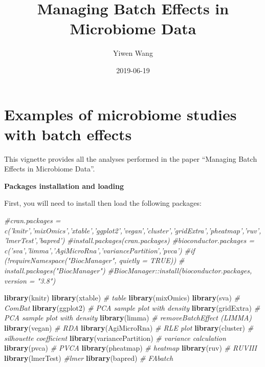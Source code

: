 \documentclass[]{book}
\title{Managing Batch Effects in Microbiome Data}
\author{Yiwen Wang}
\date{2019-06-19}
\newenvironment{Shaded}{\begin{snugshade}}{\end{snugshade}}
\newcommand{\KeywordTok}[1]{\textcolor[rgb]{0.13,0.29,0.53}{\textbf{#1}}}
\newcommand{\CommentTok}[1]{\textcolor[rgb]{0.56,0.35,0.01}{\textit{#1}}}
\newcommand{\NormalTok}[1]{#1}
\begin{document}
\maketitle

{
\setcounter{tocdepth}{3}
\tableofcontents
}
\chapter{Examples of microbiome studies with batch
effects}\label{examples-of-microbiome-studies-with-batch-effects}

This vignette provides all the analyses performed in the paper
``Managing Batch Effects in Microbiome Data''.

\textbf{Packages installation and loading}

First, you will need to install then load the following packages:

\begin{Shaded}
\begin{Highlighting}[]
\CommentTok{#cran.packages = c('knitr','mixOmics','xtable','ggplot2','vegan','cluster','gridExtra','pheatmap','ruv','lmerTest','bapred')}
\CommentTok{#install.packages(cran.packages)}
\CommentTok{#bioconductor.packages = c('sva','limma','AgiMicroRna','variancePartition','pvca')}
\CommentTok{#if (!requireNamespace("BiocManager", quietly = TRUE))}
\CommentTok{#    install.packages("BiocManager")}
\CommentTok{#BiocManager::install(bioconductor.packages, version = "3.8")}

\KeywordTok{library}\NormalTok{(knitr)}
\KeywordTok{library}\NormalTok{(xtable) }\CommentTok{# table}
\KeywordTok{library}\NormalTok{(mixOmics)}
\KeywordTok{library}\NormalTok{(sva) }\CommentTok{# ComBat}
\KeywordTok{library}\NormalTok{(ggplot2) }\CommentTok{# PCA sample plot with density}
\KeywordTok{library}\NormalTok{(gridExtra) }\CommentTok{# PCA sample plot with density}
\KeywordTok{library}\NormalTok{(limma) }\CommentTok{# removeBatchEffect (LIMMA)}
\KeywordTok{library}\NormalTok{(vegan) }\CommentTok{# RDA}
\KeywordTok{library}\NormalTok{(AgiMicroRna) }\CommentTok{# RLE plot}
\KeywordTok{library}\NormalTok{(cluster) }\CommentTok{# silhouette coefficient}
\KeywordTok{library}\NormalTok{(variancePartition) }\CommentTok{# variance calculation}
\KeywordTok{library}\NormalTok{(pvca) }\CommentTok{# PVCA}
\KeywordTok{library}\NormalTok{(pheatmap) }\CommentTok{# heatmap}
\KeywordTok{library}\NormalTok{(ruv) }\CommentTok{# RUVIII}
\KeywordTok{library}\NormalTok{(lmerTest) }\CommentTok{#lmer}
\KeywordTok{library}\NormalTok{(bapred) }\CommentTok{# FAbatch}
\end{Highlighting}
\end{Shaded}
\end{document}

